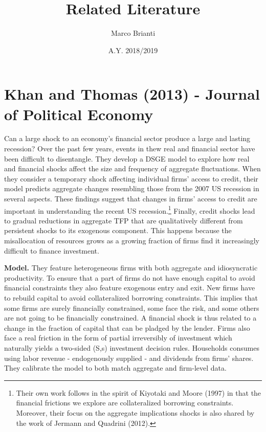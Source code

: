 \documentclass{article}
\title{Related Literature}
\author{Marco Brianti}
\date{A.Y. 2018/2019}
\begin{document}
	\large{

\maketitle

\tableofcontents

\section{Khan and Thomas (2013) - Journal of Political Economy}

Can a large shock to an economy's financial sector produce a large and lasting recession? Over the past few years, events in thew real and financial sector have been difficult to disentangle. They develop a DSGE model to explore how real and financial shocks affect the size and frequency of aggregate fluctuations. When they consider a temporary shock affecting individual firms' access to credit, their model predicts aggregate changes resembling those from the 2007 US recession in several aspects. These findings suggest that changes in firms' access to credit are important in understanding the recent US recession.\footnote{Their own work follows in the spirit of Kiyotaki and Moore (1997) in that the financial frictions we explore are collateralized borrowing constraints. Moreover, their focus on the aggregate implications shocks is also shared by the work of Jermann and Quadrini (2012).} Finally, credit shocks lead to gradual reductions in aggregate TFP that are qualitatively different from persistent shocks to its exogenous component. This happens because the misallocation of resources grows as a growing fraction of firms find it increasingly difficult to finance investment. 

\textbf{Model.} They feature heterogeneous firms with both aggregate and idiosyncratic productivity. To ensure that a part of firms do not have enough capital to avoid financial constraints they also feature exogenous entry and exit. New firms have to rebuild capital to avoid collateralized borrowing constraints. This implies that some firms are surely financially constrained, some face the risk, and some others are not going to be financially constrained. A financial shock is thus related to a change in the fraction of capital that can be pladged by the lender. Firms also face a real friction in the form of partial irreversibly of investment which naturally yields a two-sided (S,s) investment decision rules. Households consumes using labor revenue - endogenously supplied - and dividends from firms' shares. They calibrate the model to both match aggregate and firm-level data. 

}
\end{document}
